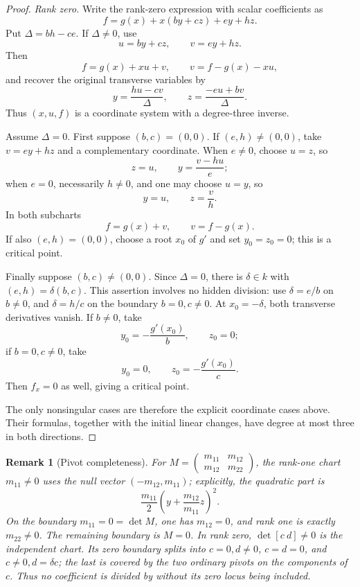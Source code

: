 \documentclass[11pt]{article}
\newtheorem{remark}[theorem]{Remark}
\begin{document}
\begin{proof}
\smallskip
\noindent\emph{Rank zero.}
Write the rank-zero expression with scalar coefficients as
\begin{equation}\label{eq:rankzero}
 f=g(x)+x(by+cz)+ey+hz.
\end{equation}
Put \(\Delta=bh-ce\).  If \(\Delta\ne0\), use
\[
u=by+cz,\qquad v=ey+hz.
\]
Then
\[
f=g(x)+xu+v,\qquad v=f-g(x)-xu,
\]
and recover the original transverse variables by
\begin{equation}\label{eq:rankzerolinearinverse}
y=\frac{hu-cv}{\Delta},\qquad
z=\frac{-eu+bv}{\Delta}.
\end{equation}
Thus \((x,u,f)\) is a coordinate system with a degree-three inverse.

Assume \(\Delta=0\).  First suppose \((b,c)=(0,0)\).  If
\((e,h)\ne(0,0)\), take \(v=ey+hz\) and a complementary coordinate.
When \(e\ne0\), choose \(u=z\), so
\[
z=u,\qquad y=\frac{v-hu}{e};
\]
when \(e=0\), necessarily \(h\ne0\), and one may choose \(u=y\), so
\[
y=u,\qquad z=\frac vh.
\]
In both subcharts
\[
f=g(x)+v,\qquad v=f-g(x).
\]
If also \((e,h)=(0,0)\), choose a root \(x_0\) of \(g'\) and set
\(y_0=z_0=0\); this is a critical point.

Finally suppose \((b,c)\ne(0,0)\).  Since \(\Delta=0\), there is
\(\delta\in k\) with \((e,h)=\delta(b,c)\).  This assertion involves
no hidden division: use \(\delta=e/b\) on \(b\ne0\), and
\(\delta=h/c\) on the boundary \(b=0,c\ne0\).  At \(x_0=-\delta\),
both transverse derivatives vanish.  If \(b\ne0\), take
\[
y_0=-\frac{g'(x_0)}b,\qquad z_0=0;
\]
if \(b=0,c\ne0\), take
\[
y_0=0,\qquad z_0=-\frac{g'(x_0)}c.
\]
Then \(f_x=0\) as well, giving a critical point.

The only nonsingular cases are therefore the explicit coordinate cases
above.  Their formulas, together with the initial linear changes, have
degree at most three in both directions.
\end{proof}

\begin{remark}[Pivot completeness]
For
\(
M=\left(\begin{smallmatrix}m_{11}&m_{12}\\m_{12}&m_{22}\end{smallmatrix}\right)
\),
the rank-one chart \(m_{11}\ne0\) uses the null vector
\((-m_{12},m_{11})\); explicitly, the quadratic part is
\[
\frac{m_{11}}2\left(y+\frac{m_{12}}{m_{11}}z\right)^2.
\]
On the boundary \(m_{11}=0=\det M\), one has
\(m_{12}=0\), and rank one is exactly \(m_{22}\ne0\).  The remaining
boundary is \(M=0\).  In rank zero, \(\det[c\ d]\ne0\) is the
independent chart.  Its zero boundary splits into \(c=0,d\ne0\),
\(c=d=0\), and \(c\ne0,d=\delta c\); the last is covered by the two
ordinary pivots on the components of \(c\).  Thus no coefficient is
divided by without its zero locus being included.
\end{remark}
\end{document}
